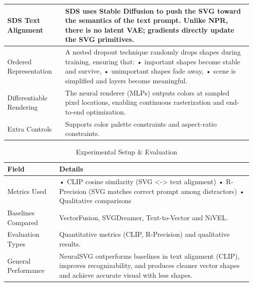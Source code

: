 \begin{table}[h!]
\begin{tabular}{|l|p{10cm}|}
    SDS Text Alignment &
    SDS uses Stable Diffusion to push the SVG toward the semantics of the text prompt.  
    Unlike NPR, there is no latent VAE; gradients directly update the SVG primitives. \\ \hline

    Ordered Representation &
    A nested dropout technique randomly drops shapes during training, ensuring that:  
    • important shapes become stable and survive,  
    • unimportant shapes fade away,  
    • scene is simplified and layers become meaningful. \\ \hline

    Differentiable Rendering &
    The neural renderer (MLPs) outputs colors at sampled pixel locations, enabling continuous rasterization and end-to-end optimization. \\ \hline

    Extra Controls &
    Supports color palette constraints and aspect-ratio constraints. \\ \hline

    \end{tabular}
    \end{table}

    \begin{table}[h!]
    \centering
    \caption{Experimental Setup \& Evaluation}
    \begin{tabular}{|l|p{10cm}|}
    \hline
    \textbf{Field} & \textbf{Details} \\ \hline

    Metrics Used &
    • CLIP cosine similarity (SVG <-> text alignment)  
    • R-Precision (SVG matches correct prompt among distractors)  
    • Qualitative comparisons  \\ \hline

    Baselines Compared &
    VectorFusion, SVGDreamer, Text-to-Vector and NiVEL. \\ \hline

    Evaluation Types &
    Quantitative metrics (CLIP, R-Precision) and qualitative results. \\ \hline

    General Performance &
    NeuralSVG outperforms baselines in text alignment (CLIP), improves recognizability,  
    and produces cleaner vector shapes and achieve accurate visual with less shapes. \\ \hline

    \end{tabular}
    \end{table}

